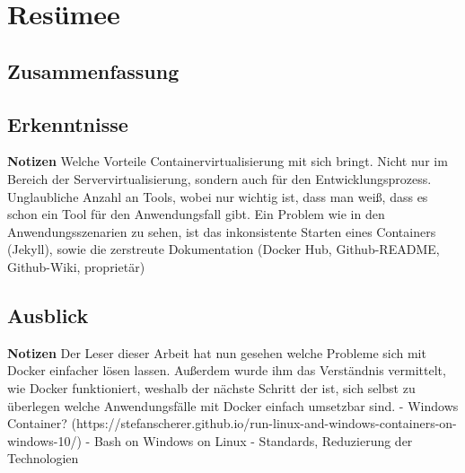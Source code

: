 
\chapter{Resümee}
\section{Zusammenfassung}

\section{Erkenntnisse}
\textbf{Notizen}
Welche Vorteile Containervirtualisierung mit sich bringt. Nicht nur im Bereich der Servervirtualisierung, sondern auch für den Entwicklungsprozess.
Unglaubliche Anzahl an Tools, wobei nur wichtig ist, dass man weiß, dass es schon ein Tool für den Anwendungsfall gibt.
Ein Problem wie in den Anwendungsszenarien zu sehen, ist das inkonsistente Starten eines Containers (Jekyll), sowie die zerstreute Dokumentation (Docker Hub, Github-README, Github-Wiki, proprietär)

\section{Ausblick}
\textbf{Notizen}
Der Leser dieser Arbeit hat nun gesehen welche Probleme sich mit Docker einfacher lösen lassen. Außerdem wurde ihm das Verständnis vermittelt, wie Docker funktioniert, weshalb der nächste Schritt der ist, sich selbst zu überlegen welche Anwendungsfälle mit Docker einfach umsetzbar sind.
- Windows Container? (https://stefanscherer.github.io/run-linux-and-windows-containers-on-windows-10/)
- Bash on Windows on Linux
- Standards, Reduzierung der Technologien
